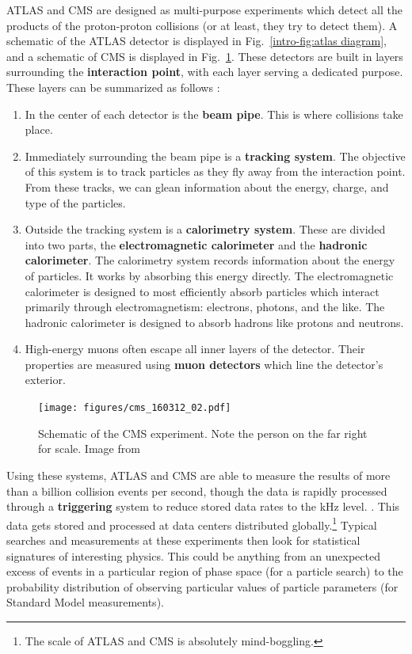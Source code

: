 \documentclass[../thesis.tex]{subfiles}
\begin{document}
	ATLAS and CMS are designed as multi-purpose experiments which detect all the products of the proton-proton collisions (or at least, they try to detect them). A schematic of the ATLAS detector is displayed in Fig.~\ref{intro-fig:atlas diagram}, and a schematic of CMS is displayed in Fig.~\ref{intro-fig:cms diagram}. These detectors are built in layers surrounding the \textbf{interaction point}, with each layer serving a dedicated purpose. These layers can be summarized as follows \cite{larkoski_elementary_2019-1}:
	\begin{enumerate}
		\item In the center of each detector is the \textbf{beam pipe}. This is where collisions take place.

		\item Immediately surrounding the beam pipe is a \textbf{tracking system}. The objective of this system is to track particles as they fly away from the interaction point. From these tracks, we can glean information about the energy, charge, and type of the particles.

		\item Outside the tracking system is a \textbf{calorimetry system}. These are divided into two parts, the \textbf{electromagnetic calorimeter} and the \textbf{hadronic calorimeter}. The calorimetry system records information about the energy of particles. It works by absorbing this energy directly. The electromagnetic calorimeter is designed to most efficiently absorb particles which interact primarily through electromagnetism: electrons, photons, and the like. The hadronic calorimeter is designed to absorb hadrons like protons and neutrons.

		\item High-energy muons often escape all inner layers of the detector. Their properties are measured using \textbf{muon detectors} which line the detector's exterior.
	\end{enumerate}

	\begin{figure}
	\begin{center}
		\texttt{[image: figures/cms\_160312\_02.pdf]}
		\caption{\label{intro-fig:cms diagram}Schematic of the CMS experiment. Note the person on the far right for scale. Image from \cite{sakuma_detector_2014}}
	\end{center}
	\end{figure}

	Using these systems, ATLAS and CMS are able to measure the results of more than a billion collision events per second, though the data is rapidly processed through a \textbf{triggering} system to reduce stored data rates to the \si{\kilo\hertz} level. \cite{atlas_outreach_atlas_2012,atlas_collaboration_performance_2017}. This data gets stored and processed at data centers distributed globally.\footnote{The scale of ATLAS and CMS is absolutely mind-boggling.} Typical searches and measurements at these experiments then look for statistical signatures of interesting physics. This could be anything from an unexpected excess of events in a particular region of phase space (for a particle search) to the probability distribution of observing particular values of particle parameters (for Standard Model measurements). 
\end{document}
